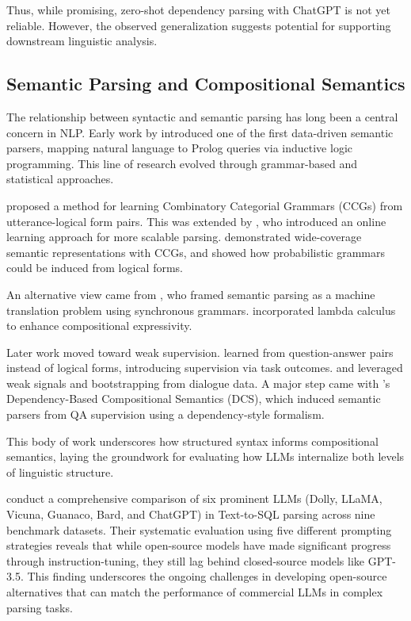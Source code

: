 Thus, while promising, zero-shot dependency parsing with ChatGPT is not yet reliable. However, the observed generalization suggests potential for supporting downstream linguistic analysis.

\subsection{Semantic Parsing and Compositional Semantics}

The relationship between syntactic and semantic parsing has long been a central concern in NLP. Early work by \citet{zelle1996} introduced one of the first data-driven semantic parsers, mapping natural language to Prolog queries via inductive logic programming. This line of research evolved through grammar-based and statistical approaches.

\citet{zettlemoyer2005} proposed a method for learning Combinatory Categorial Grammars (CCGs) from utterance-logical form pairs. This was extended by \citet{zettlemoyer2007online}, who introduced an online learning approach for more scalable parsing. \citet{bos2004} demonstrated wide-coverage semantic representations with CCGs, and \citet{kwiatkowski2010} showed how probabilistic grammars could be induced from logical forms.

An alternative view came from \citet{wong2006learning}, who framed semantic parsing as a machine translation problem using synchronous grammars. \citet{wong2007} incorporated lambda calculus to enhance compositional expressivity.

Later work moved toward weak supervision. \citet{clarke2010} learned from question-answer pairs instead of logical forms, introducing supervision via task outcomes. \citet{goldwasser2011confidence} and \citet{artzi2011} leveraged weak signals and bootstrapping from dialogue data. A major step came with \citet{liang2013learning}'s Dependency-Based Compositional Semantics (DCS), which induced semantic parsers from QA supervision using a dependency-style formalism.

This body of work underscores how structured syntax informs compositional semantics, laying the groundwork for evaluating how LLMs internalize both levels of linguistic structure.

\citet{sun-etal-2023-battle} conduct a comprehensive comparison of six prominent LLMs (Dolly, LLaMA, Vicuna, Guanaco, Bard, and ChatGPT) in Text-to-SQL parsing across nine benchmark datasets. Their systematic evaluation using five different prompting strategies reveals that while open-source models have made significant progress through instruction-tuning, they still lag behind closed-source models like GPT-3.5. This finding underscores the ongoing challenges in developing open-source alternatives that can match the performance of commercial LLMs in complex parsing tasks.

